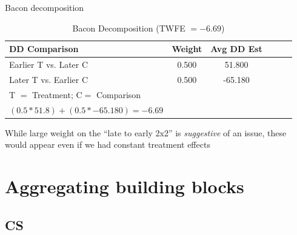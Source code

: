 \documentclass{beamer}
\begin{document}
\begin{frame}{Bacon decomposition}
\begin{table}[htbp]\centering
\small
\caption{Bacon Decomposition (TWFE $= -6.69$)}
\begin{center}
\begin{tabular}{l*{5}{c}}
\hline
\multicolumn{1}{l}{\textbf{DD Comparison}}&
\multicolumn{1}{l}{\textbf{Weight}}&
\multicolumn{1}{l}{\textbf{Avg DD Est}}\\
\hline
Earlier T vs. Later C  &     0.500   &       51.800 \\
Later T vs. Earlier C   &    0.500    &     -65.180 \\
\midrule
T $=$ Treatment; C$ =$ Comparison \\
$(0.5*51.8) + (0.5*-65.180) = -6.69$ \\
\hline
\end{tabular}
\end{center}
\end{table}

\bigskip

While large weight on the ``late to early 2x2'' is \emph{suggestive} of an issue, these would appear even if we had constant treatment effects

\end{frame}










\section{Aggregating building blocks}

\subsection{CS}
\end{document}
